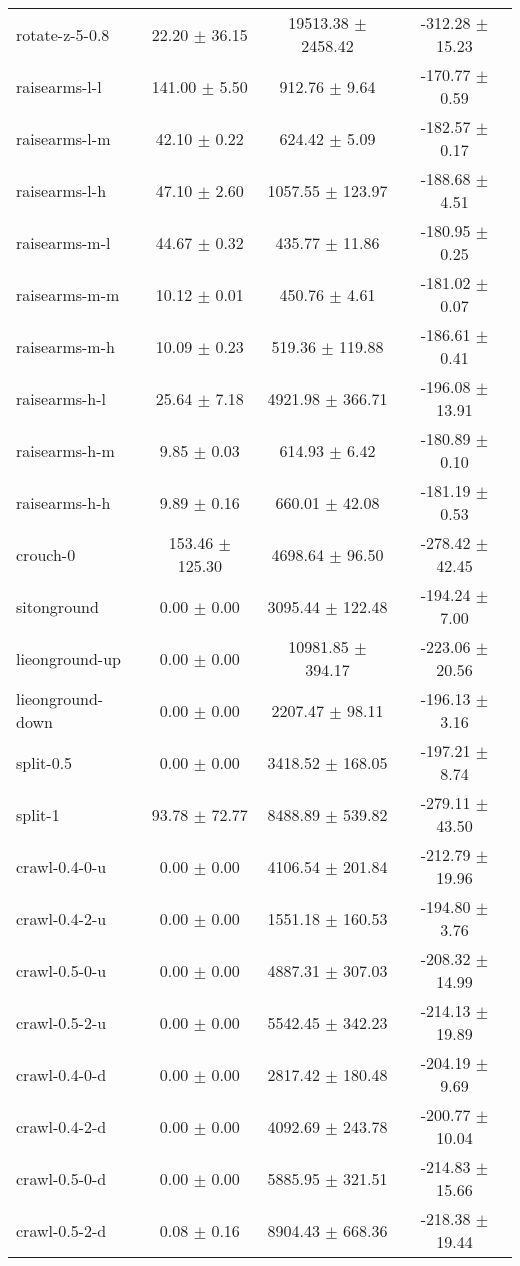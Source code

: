 \begin{tabular}{|lccc|}
rotate-z-5-0.8 & 22.20 $\pm$ 36.15 & 19513.38 $\pm$ 2458.42 & -312.28 $\pm$ 15.23 \\
raisearms-l-l & 141.00 $\pm$ 5.50 & 912.76 $\pm$ 9.64 & -170.77 $\pm$ 0.59 \\
raisearms-l-m & 42.10 $\pm$ 0.22 & 624.42 $\pm$ 5.09 & -182.57 $\pm$ 0.17 \\
raisearms-l-h & 47.10 $\pm$ 2.60 & 1057.55 $\pm$ 123.97 & -188.68 $\pm$ 4.51 \\
raisearms-m-l & 44.67 $\pm$ 0.32 & 435.77 $\pm$ 11.86 & -180.95 $\pm$ 0.25 \\
raisearms-m-m & 10.12 $\pm$ 0.01 & 450.76 $\pm$ 4.61 & -181.02 $\pm$ 0.07 \\
raisearms-m-h & 10.09 $\pm$ 0.23 & 519.36 $\pm$ 119.88 & -186.61 $\pm$ 0.41 \\
raisearms-h-l & 25.64 $\pm$ 7.18 & 4921.98 $\pm$ 366.71 & -196.08 $\pm$ 13.91 \\
raisearms-h-m & 9.85 $\pm$ 0.03 & 614.93 $\pm$ 6.42 & -180.89 $\pm$ 0.10 \\
raisearms-h-h & 9.89 $\pm$ 0.16 & 660.01 $\pm$ 42.08 & -181.19 $\pm$ 0.53 \\
crouch-0 & 153.46 $\pm$ 125.30 & 4698.64 $\pm$ 96.50 & -278.42 $\pm$ 42.45 \\
sitonground & 0.00 $\pm$ 0.00 & 3095.44 $\pm$ 122.48 & -194.24 $\pm$ 7.00 \\
lieonground-up & 0.00 $\pm$ 0.00 & 10981.85 $\pm$ 394.17 & -223.06 $\pm$ 20.56 \\
lieonground-down & 0.00 $\pm$ 0.00 & 2207.47 $\pm$ 98.11 & -196.13 $\pm$ 3.16 \\
split-0.5 & 0.00 $\pm$ 0.00 & 3418.52 $\pm$ 168.05 & -197.21 $\pm$ 8.74 \\
split-1 & 93.78 $\pm$ 72.77 & 8488.89 $\pm$ 539.82 & -279.11 $\pm$ 43.50 \\
crawl-0.4-0-u & 0.00 $\pm$ 0.00 & 4106.54 $\pm$ 201.84 & -212.79 $\pm$ 19.96 \\
crawl-0.4-2-u & 0.00 $\pm$ 0.00 & 1551.18 $\pm$ 160.53 & -194.80 $\pm$ 3.76 \\
crawl-0.5-0-u & 0.00 $\pm$ 0.00 & 4887.31 $\pm$ 307.03 & -208.32 $\pm$ 14.99 \\
crawl-0.5-2-u & 0.00 $\pm$ 0.00 & 5542.45 $\pm$ 342.23 & -214.13 $\pm$ 19.89 \\
crawl-0.4-0-d & 0.00 $\pm$ 0.00 & 2817.42 $\pm$ 180.48 & -204.19 $\pm$ 9.69 \\
crawl-0.4-2-d & 0.00 $\pm$ 0.00 & 4092.69 $\pm$ 243.78 & -200.77 $\pm$ 10.04 \\
crawl-0.5-0-d & 0.00 $\pm$ 0.00 & 5885.95 $\pm$ 321.51 & -214.83 $\pm$ 15.66 \\
crawl-0.5-2-d & 0.08 $\pm$ 0.16 & 8904.43 $\pm$ 668.36 & -218.38 $\pm$ 19.44 \\
\hline
\end{tabular}
